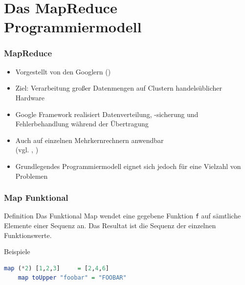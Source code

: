 \documentclass[presentation, shownotes]{beamer}
\begin{document}

\section[MapReduce]{Das MapReduce Programmiermodell}

\begin{frame}
\tableofcontents[currentsection]
\end{frame}

\setcounter{subsection}{1}

\begin{frame}
\frametitle{MapReduce}
    \begin{itemize}
        \item Vorgestellt von den Googlern \citeauthor{DBLP:conf/osdi/DeanG04} (\citeyear{DBLP:conf/osdi/DeanG04})
        \item Ziel: Verarbeitung großer Datenmengen auf Clustern handelsüblicher Hardware
        \item Google Framework realisiert Datenverteilung, -sicherung und Fehlerbehandlung während der Übertragung
        \item Auch auf einzelnen Mehrkernrechnern anwendbar\\
        (vgl. \cite{ranger2007evaluating}, \cite{talbot2011phoenix})
        \item Grundlegendes Programmiermodell eignet sich jedoch für eine Vielzahl von Problemen
    \end{itemize}
\end{frame}


\begin{frame}[fragile]
\frametitle{Map Funktional}
    \begin{block}{Definition}
        Das Funktional Map wendet eine gegebene Funktion \texttt{f} auf sämtliche Elemente einer Sequenz an. Das Resultat ist die Sequenz der einzelnen Funktionswerte.
    \end{block}

    \begin{block}{Beispiele}
    \begin{lstlisting}[language=haskell]
    map (*2) [1,2,3]     = [2,4,6]
    map toUpper "foobar" = "FOOBAR"
    \end{lstlisting}
    \end{block}
\end{frame}
\end{document}
